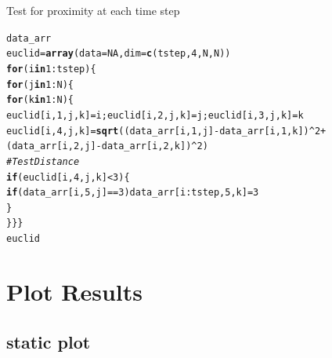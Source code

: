 \documentclass{article}\usepackage[]{graphicx}\usepackage[]{color}
\makeatletter
\newcommand{\hlnum}[1]{\textcolor[rgb]{0.686,0.059,0.569}{#1}}%
\newcommand{\hlcom}[1]{\textcolor[rgb]{0.678,0.584,0.686}{\textit{#1}}}%
\newcommand{\hlopt}[1]{\textcolor[rgb]{0,0,0}{#1}}%
\newcommand{\hlstd}[1]{\textcolor[rgb]{0.345,0.345,0.345}{#1}}%
\newcommand{\hlkwa}[1]{\textcolor[rgb]{0.161,0.373,0.58}{\textbf{#1}}}%
\newcommand{\hlkwb}[1]{\textcolor[rgb]{0.69,0.353,0.396}{#1}}%
\newcommand{\hlkwc}[1]{\textcolor[rgb]{0.333,0.667,0.333}{#1}}%
\newcommand{\hlkwd}[1]{\textcolor[rgb]{0.737,0.353,0.396}{\textbf{#1}}}%
\newenvironment{kframe}{%
 \def\at@end@of@kframe{}%
 \ifinner\ifhmode%
  \def\at@end@of@kframe{\end{minipage}}%
  \begin{minipage}{\columnwidth}%
 \fi\fi%
 \def\FrameCommand##1{\hskip\@totalleftmargin \hskip-\fboxsep
 \colorbox{shadecolor}{##1}\hskip-\fboxsep
     \hskip-\linewidth \hskip-\@totalleftmargin \hskip\columnwidth}%
 \MakeFramed {\advance\hsize-\width
   \@totalleftmargin\z@ \linewidth\hsize
   \@setminipage}}%
 {\par\unskip\endMakeFramed%
 \at@end@of@kframe}
\newenvironment{knitrout}{}{} %
\makeatother
\begin{document}
Test for proximity at each time step
\begin{knitrout}
\color{fgcolor}\begin{kframe}
\begin{alltt}
\hlstd{data_arr}
\hlstd{euclid} \hlkwb{=} \hlkwd{array}\hlstd{(}\hlkwc{data}\hlstd{=}\hlnum{NA}\hlstd{,} \hlkwc{dim}\hlstd{=}\hlkwd{c}\hlstd{(tstep,} \hlnum{4}\hlstd{, N, N))}
\hlkwa{for}\hlstd{(i} \hlkwa{in} \hlnum{1}\hlopt{:}\hlstd{tstep)\{}
\hlkwa{for}\hlstd{(j} \hlkwa{in} \hlnum{1}\hlopt{:}\hlstd{N)\{}
\hlkwa{for}\hlstd{(k} \hlkwa{in} \hlnum{1}\hlopt{:}\hlstd{N)\{}
\hlstd{euclid[i,}\hlnum{1}\hlstd{,j,k]}\hlkwb{=}\hlstd{i; euclid[i,}\hlnum{2}\hlstd{,j,k]}\hlkwb{=}\hlstd{j; euclid[i,} \hlnum{3}\hlstd{, j,k]}\hlkwb{=}\hlstd{k}
\hlstd{euclid[i,}\hlnum{4}\hlstd{,j,k]} \hlkwb{=} \hlkwd{sqrt}\hlstd{((data_arr[i,}\hlnum{1}\hlstd{,j]}\hlopt{-}\hlstd{data_arr[i,} \hlnum{1}\hlstd{, k])}\hlopt{^}\hlnum{2}\hlopt{+}\hlstd{(data_arr[i,}\hlnum{2}\hlstd{,j]}\hlopt{-}\hlstd{data_arr[i,} \hlnum{2}\hlstd{,k])}\hlopt{^}\hlnum{2}\hlstd{)}
\hlcom{# Test Distance}
\hlkwa{if}\hlstd{(euclid[i,}\hlnum{4}\hlstd{,j,k]} \hlopt{<} \hlnum{3}\hlstd{)\{}
  \hlkwa{if}\hlstd{(data_arr[i,}\hlnum{5}\hlstd{,j]} \hlopt{==} \hlnum{3}\hlstd{) data_arr[i}\hlopt{:}\hlstd{tstep,}\hlnum{5}\hlstd{,k]}\hlkwb{=}\hlnum{3}
  \hlstd{\}}
\hlstd{\}\}\}}
\hlstd{euclid}
\end{alltt}
\end{kframe}
\end{knitrout}

\section{Plot Results}

\subsection{static plot}
\end{document}
